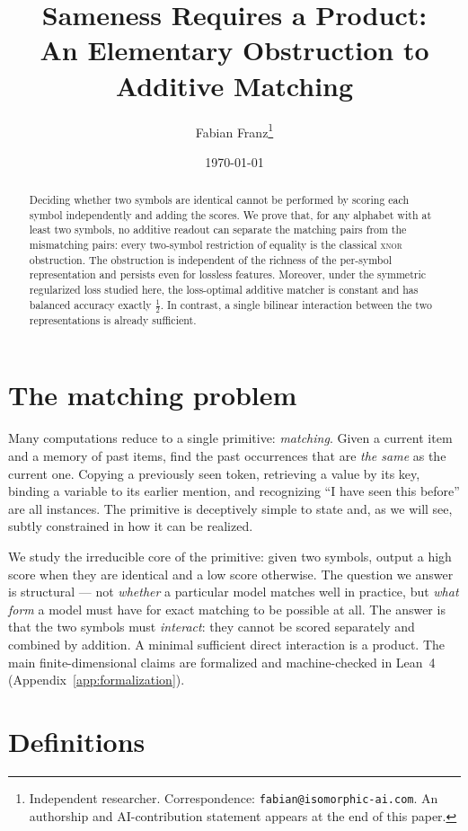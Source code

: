 \documentclass[11pt]{article}
\title{\textbf{Sameness Requires a Product:\\ An Elementary Obstruction to Additive Matching}}
\author{Fabian Franz\thanks{Independent researcher. Correspondence: \texttt{fabian@isomorphic-ai.com}. An authorship and AI-contribution statement appears at the end of this paper.}}
\date{\today}
\theoremstyle{plain}
\theoremstyle{definition}
\theoremstyle{remark}
\begin{document}
\maketitle

\begin{abstract}
Deciding whether two symbols are identical cannot be performed by scoring each symbol independently and adding the scores. We prove that, for any alphabet with at least two symbols, no additive readout can separate the matching pairs from the mismatching pairs: every two-symbol restriction of equality is the classical \textsc{xnor} obstruction. The obstruction is independent of the richness of the per-symbol representation and persists even for lossless features. Moreover, under the symmetric regularized loss studied here, the loss-optimal additive matcher is constant and has balanced accuracy exactly $\tfrac12$. In contrast, a single bilinear interaction between the two representations is already sufficient.
\end{abstract}

\section{The matching problem}
\label{sec:problem}

Many computations reduce to a single primitive: \emph{matching}. Given a current item and a memory of past items, find the past occurrences that are \emph{the same} as the current one. Copying a previously seen token, retrieving a value by its key, binding a variable to its earlier mention, and recognizing ``I have seen this before'' are all instances. The primitive is deceptively simple to state and, as we will see, subtly constrained in how it can be realized.

We study the irreducible core of the primitive: given two symbols, output a high score when they are identical and a low score otherwise. The question we answer is structural --- not \emph{whether} a particular model matches well in practice, but \emph{what form} a model must have for exact matching to be possible at all. The answer is that the two symbols must \emph{interact}: they cannot be scored separately and combined by addition. A minimal sufficient direct interaction is a product. The main finite-dimensional claims are formalized and machine-checked in Lean~4 (Appendix~\ref{app:formalization}).

\section{Definitions}
\label{sec:defs}
\end{document}
